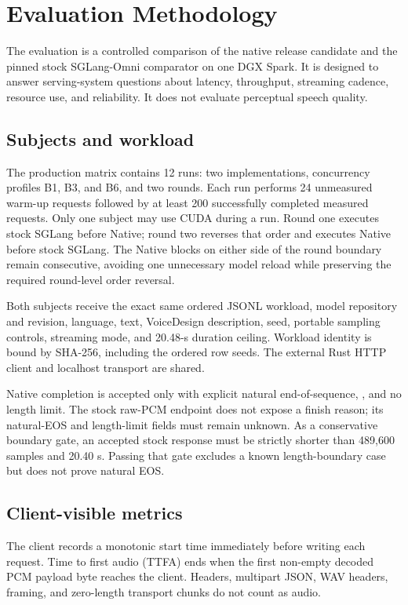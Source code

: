 \section{Evaluation Methodology}
\label{sec:evaluation}

The evaluation is a controlled comparison of the native release candidate and
the pinned stock SGLang-Omni comparator on one DGX Spark. It is designed to
answer serving-system questions about latency, throughput, streaming cadence,
resource use, and reliability. It does not evaluate perceptual speech quality.

\subsection{Subjects and workload}

The production matrix contains 12 runs: two implementations, concurrency
profiles B1, B3, and B6, and two rounds. Each run performs 24 unmeasured warm-up
requests followed by at least 200 successfully completed measured requests.
Only one subject may use CUDA during a run. Round one executes stock SGLang
before Native; round two reverses that order and executes Native before stock
SGLang. The Native blocks on either side of the round boundary remain
consecutive, avoiding one unnecessary model reload while preserving the
required round-level order reversal.

Both subjects receive the exact same ordered JSONL workload, model repository
and revision, language, text, VoiceDesign description, seed, portable sampling
controls, streaming mode, and 20.48-s duration ceiling. Workload identity is
bound by SHA-256, including the ordered row seeds. The external Rust HTTP client
and localhost transport are shared.

Native completion is accepted only with explicit natural end-of-sequence,
, and no length limit. The stock raw-PCM endpoint does
not expose a finish reason; its natural-EOS and length-limit fields must remain
unknown. As a conservative boundary gate, an accepted stock response must be
strictly shorter than 489,600 samples and 20.40 s. Passing that gate excludes a
known length-boundary case but does not prove natural EOS.

\subsection{Client-visible metrics}

The client records a monotonic start time immediately before writing each
request. Time to first audio (TTFA) ends when the first non-empty decoded PCM
payload byte reaches the client. Headers, multipart JSON, WAV headers, framing,
and zero-length transport chunks do not count as audio.

